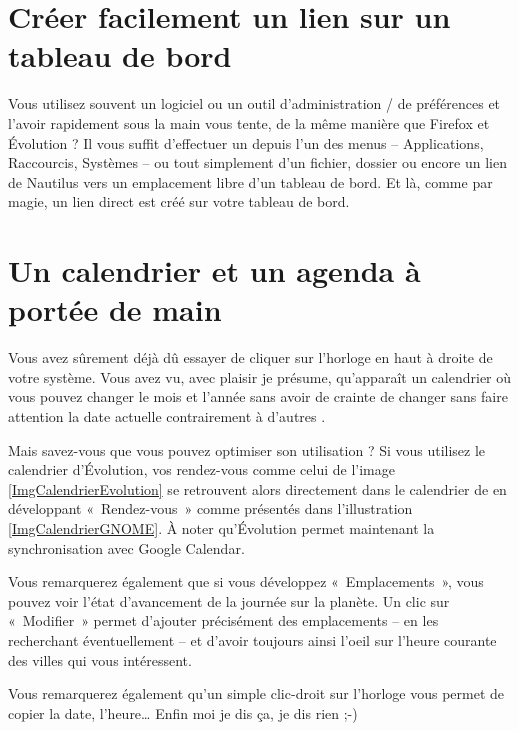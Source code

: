 \section{Créer facilement un lien sur un tableau de bord}
Vous utilisez souvent un logiciel ou un outil d'administration / de préférences et l'avoir rapidement sous la main vous tente, de la même manière que Firefox et Évolution ? Il vous suffit d'effectuer un  depuis l'un des menus -- Applications, Raccourcis, Systèmes -- ou tout simplement d'un fichier, dossier ou encore un lien de Nautilus vers un emplacement libre d'un tableau de bord. Et là, comme par magie, un lien direct est créé sur votre tableau de bord.
\section{Un calendrier et un agenda à portée de main}
\label{RefCalendrierEvolution}
Vous avez sûrement déjà dû essayer de cliquer sur l'horloge en haut à droite de votre système. Vous avez vu, avec plaisir je présume, qu'apparaît un calendrier où vous pouvez changer le mois et l'année sans avoir de crainte de changer sans faire attention la date actuelle contrairement à d'autres .\par
Mais savez-vous que vous pouvez optimiser son utilisation ? Si vous utilisez le calendrier d'Évolution, vos rendez-vous comme celui de l'image \ref{ImgCalendrierEvolution} se retrouvent alors directement dans le calendrier de  en développant «~Rendez-vous~» comme présentés dans l'illustration \ref{ImgCalendrierGNOME}. À noter qu'Évolution permet maintenant la synchronisation avec Google Calendar.\par
{}
Vous remarquerez également que si vous développez «~Emplacements~», vous pouvez voir l'état d'avancement de la journée sur la planète. Un clic sur «~Modifier~» permet d'ajouter précisément des emplacements -- en les recherchant éventuellement -- et d'avoir toujours ainsi l'oeil sur l'heure courante des villes qui vous intéressent.
\begin{nota}
Vous remarquerez également qu'un simple clic-droit sur l'horloge vous permet de copier la date, l'heure\ldots{} Enfin moi je dis ça, je dis rien ;-)
\end{nota}
